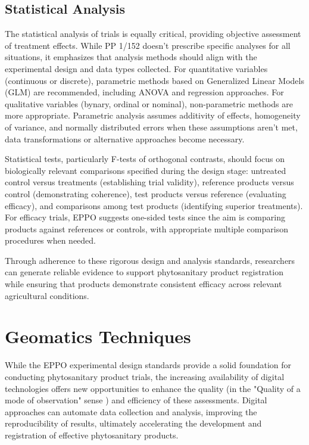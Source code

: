 \documentclass[12pt,a4paper,oneside]{report}
\begin{document}
\subsection{Statistical Analysis}

The statistical analysis of trials is equally critical, providing objective 
assessment of treatment effects. While PP 1/152 \cite{EPPO_PP1_152} doesn't prescribe 
specific analyses for all situations, it emphasizes that analysis methods should 
align with the experimental design and data types collected. For quantitative 
variables (continuous or discrete), parametric methods based on Generalized 
Linear Models (GLM) are recommended, including ANOVA and regression approaches. 
For qualitative variables (bynary, ordinal or nominal), non-parametric methods are more 
appropriate. Parametric analysis assumes additivity of effects, homogeneity of variance, 
and normally distributed errors when these assumptions aren't met, data transformations 
or alternative approaches become necessary.

Statistical tests, particularly F-tests of orthogonal 
contrasts, should focus on biologically relevant comparisons specified during the 
design stage: untreated control versus treatments (establishing trial validity), 
reference products versus control (demonstrating coherence), test products versus 
reference (evaluating efficacy), and comparisons among test products (identifying 
superior treatments). For efficacy trials, EPPO suggests one-sided tests since the 
aim is comparing products against references or controls, with appropriate multiple 
comparison procedures when needed.

Through adherence to these rigorous design and analysis standards, researchers can 
generate reliable evidence to support phytosanitary product registration while ensuring 
that products demonstrate consistent efficacy across relevant agricultural conditions.

\section{Geomatics Techniques}

While the EPPO experimental design standards provide a solid foundation for conducting
phytosanitary product trials, the increasing availability of digital technologies
offers new opportunities to enhance the quality (in the "Quality of a mode of observation" sense \cite{EPPO_PP1_152}) 
and efficiency of these assessments.
Digital approaches can automate data collection and analysis, improving the
reproducibility of results, ultimately accelerating the development and registration of
effective phytosanitary products.
\end{document}
